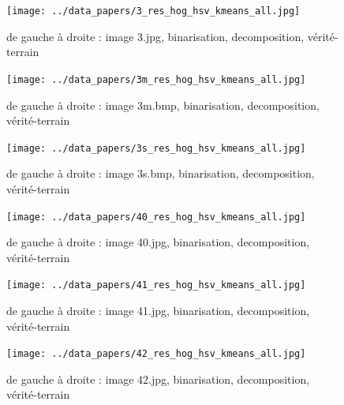 \documentclass{book}
\begin{document}
\begin{figure}[H]
\begin{center}
\texttt{[image: ../data\_papers/3\_res\_hog\_hsv\_kmeans\_all.jpg]}
\end{center}
\caption{de gauche à droite : image 3.jpg, binarisation, decomposition, vérité-terrain}
\label{3}
\end{figure}
\clearpage


\begin{figure}[H]
\begin{center}
\texttt{[image: ../data\_papers/3m\_res\_hog\_hsv\_kmeans\_all.jpg]}
\end{center}
\caption{de gauche à droite : image 3m.bmp, binarisation, decomposition, vérité-terrain}
\label{3m}
\end{figure}
\clearpage


\begin{figure}[H]
\begin{center}
\texttt{[image: ../data\_papers/3s\_res\_hog\_hsv\_kmeans\_all.jpg]}
\end{center}
\caption{de gauche à droite : image 3s.bmp, binarisation, decomposition, vérité-terrain}
\label{3s}
\end{figure}
\clearpage


\begin{figure}[H]
\begin{center}
\texttt{[image: ../data\_papers/40\_res\_hog\_hsv\_kmeans\_all.jpg]}
\end{center}
\caption{de gauche à droite : image 40.jpg, binarisation, decomposition, vérité-terrain}
\label{40}
\end{figure}
\clearpage


\begin{figure}[H]
\begin{center}
\texttt{[image: ../data\_papers/41\_res\_hog\_hsv\_kmeans\_all.jpg]}
\end{center}
\caption{de gauche à droite : image 41.jpg, binarisation, decomposition, vérité-terrain}
\label{41}
\end{figure}
\clearpage


\begin{figure}[H]
\begin{center}
\texttt{[image: ../data\_papers/42\_res\_hog\_hsv\_kmeans\_all.jpg]}
\end{center}
\caption{de gauche à droite : image 42.jpg, binarisation, decomposition, vérité-terrain}
\label{42}
\end{figure}
\clearpage
\end{document}
